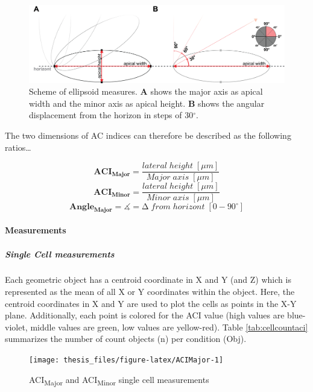 \documentclass[11pt,singlespacinge,twoside]{reedthesis} %
\begin{document}
\begin{figure}

{\centering \includegraphics[width=0.75\linewidth]{figure/02-MaMo/ACI/ellipse} 

}

\caption[Scheme of ellipsoid measures]{Scheme of ellipsoid measures. \textbf{A} shows the major axis as apical width and the minor axis as apical height. \textbf{B} shows the angular displacement from the horizon in steps of 30\(^\circ\).}\label{fig:ellipse}
\end{figure}
The two dimensions of AC indices can therefore be described as the following ratios\ldots{}

\[\mathbf{ACI_{Major}} = \frac{lateral\;height\;[\mu m]}{Major\;axis\;[\mu m]}\]
\[\mathbf{ACI_{Minor}} = \frac{lateral\;height\;[\mu m]}{Minor\;axis\;[\mu m]}\]
\[\mathbf{Angle_{Major}} = \measuredangle = \mathrm{\Delta}\;from\;horizont\;[0-90^\circ]\]

\hypertarget{ACI-Dis}{%
\paragraph{Measurements}\label{ACI-Dis}}

\hypertarget{ACI-singlecell}{%
\subparagraph{Single Cell measurements}\label{ACI-singlecell}}

Each geometric object has a centroid coordinate in X and Y (and Z) which is represented as the mean of all X or Y coordinates within the object. Here, the centroid coordinates in X and Y are used to plot the cells as points in the X-Y plane. Additionally, each point is colored for the ACI value (high values are blue-violet, middle values are green, low values are yellow-red). Table \ref{tab:cellcountaci} summarizes the number of count objects (n) per condition (Obj).


\begin{figure}

{\centering \texttt{[image: thesis\_files/figure-latex/ACIMajor-1]} 

}

\caption{ACI\textsubscript{Major} and ACI\textsubscript{Minor} single cell measurements}\label{fig:ACIMajor}
\end{figure}
\end{document}
